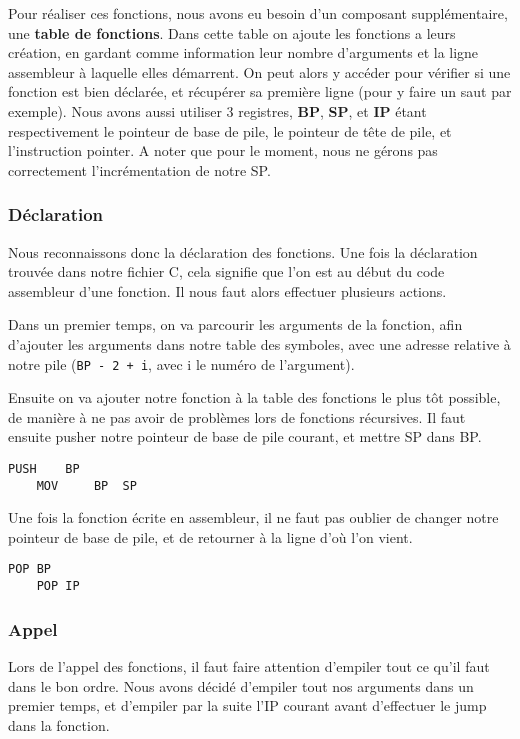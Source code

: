     Pour réaliser ces fonctions, nous avons eu besoin d'un composant supplémentaire, une \textbf{table de fonctions}. Dans cette table on ajoute les fonctions a leurs création, en gardant comme information leur nombre d'arguments et la ligne assembleur à laquelle elles démarrent. On peut alors y accéder pour vérifier si une fonction est bien déclarée, et récupérer sa première ligne (pour y faire un saut par exemple). Nous avons aussi utiliser 3 registres, \textbf{BP}, \textbf{SP}, et \textbf{IP} étant respectivement le pointeur de base de pile, le pointeur de tête de pile, et l'instruction pointer. A noter que pour le moment, nous ne gérons pas correctement l'incrémentation de notre SP.
    
    \subsubsection*{Déclaration}
    Nous reconnaissons donc la déclaration des fonctions. Une fois la déclaration trouvée dans notre fichier C, cela signifie que l'on est au début du code assembleur d'une fonction. Il nous faut alors effectuer plusieurs actions.
    
    Dans un premier temps, on va parcourir les arguments de la fonction, afin d'ajouter les arguments dans notre table des symboles, avec une adresse relative à notre pile (\texttt{BP - 2 + i}, avec i le numéro de l'argument).
    
    Ensuite on va ajouter notre fonction à la table des fonctions le plus tôt possible, de manière à ne pas avoir de problèmes lors de fonctions récursives. Il faut ensuite pusher notre pointeur de base de pile courant, et mettre SP dans BP.
    
    \begin{lstlisting}[language={[custom]Assembler},basicstyle=\footnotesize]
    PUSH    BP
    MOV     BP  SP
    \end{lstlisting}
    
    Une fois la fonction écrite en assembleur, il ne faut pas oublier de changer notre pointeur de base de pile, et de retourner à la ligne d'où l'on vient.
    \begin{lstlisting}[language={[custom]Assembler},basicstyle=\footnotesize]
    POP BP
    POP IP
    \end{lstlisting}

    \subsubsection*{Appel}
    Lors de l'appel des fonctions, il faut faire attention d'empiler tout ce qu'il faut dans le bon ordre. Nous avons décidé d'empiler tout nos arguments dans un premier temps, et d'empiler par la suite l'IP courant avant d'effectuer le jump dans la fonction.
    
